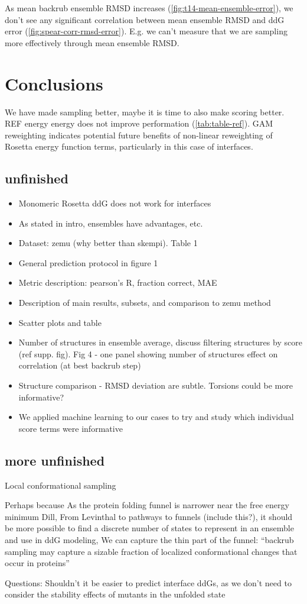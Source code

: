 As mean backrub ensemble RMSD increases (\cref{fig:t14-mean-ensemble-error}), we don't see any significant correlation between mean ensemble RMSD and ddG error (\cref{fig:spear-corr-rmsd-error}). E.g. we can't measure that we are sampling more effectively through mean ensemble RMSD.

\section{Conclusions}

We have made sampling better, maybe it is time to also make scoring better. REF energy energy does not improve performation (\cref{tab:table-ref}).
GAM reweighting indicates potential future benefits of non-linear reweighting of Rosetta energy function terms, particularly in this case of interfaces.

\subsection{unfinished}

\begin{itemize}
\item Monomeric Rosetta ddG does not work for interfaces
\item As stated in intro, ensembles have advantages, etc.
\item Dataset: zemu (why better than skempi). Table 1
\item General prediction protocol in figure 1
\item Metric description: pearson’s R, fraction correct, MAE
\item Description of main results, subsets, and comparison to zemu method
\item Scatter plots and table
\item Number of structures in ensemble average, discuss filtering structures by score (ref supp. fig). Fig 4 - one panel showing number of structures effect on correlation (at best backrub step)
\item Structure comparison - RMSD deviation are subtle. Torsions could be more informative?
\item We applied machine learning to our cases to try and study which individual score terms were informative
\end{itemize}

\subsection{more unfinished}
Local conformational sampling

Perhaps because
As the protein folding funnel is narrower near the free energy minimum {Dill, From Levinthal to pathways to funnels (include this?)}, it should be more possible to find a discrete number of states to represent in an ensemble and use in ddG modeling,
We can capture the thin part of the funnel:
“backrub sampling may capture a sizable fraction of localized conformational changes that occur in proteins” \cite{humphris_prediction_2008}

Questions:
Shouldn’t it be easier to predict interface ddGs, as we don’t need to consider the stability effects of mutants in the unfolded state
